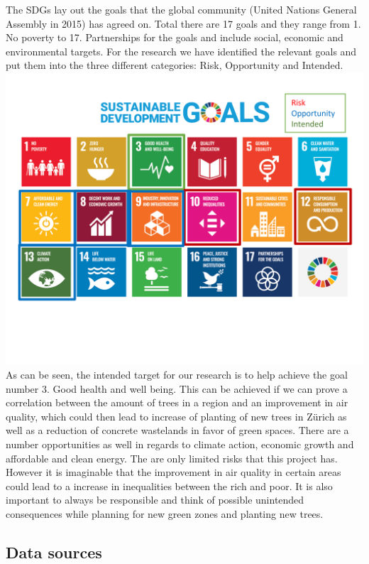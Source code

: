 \documentclass[
]{article}
\begin{document}
The SDGs lay out the goals that the global community (United Nations
General Assembly in 2015) has agreed on. Total there are 17 goals and
they range from 1. No poverty to 17. Partnerships for the goals and
include social, economic and environmental targets. For the research we
have identified the relevant goals and put them into the three different
categories: Risk, Opportunity and Intended.
\includegraphics{../images/sdg.png} As can be seen, the intended target
for our research is to help achieve the goal number 3. Good health and
well being. This can be achieved if we can prove a correlation between
the amount of trees in a region and an improvement in air quality, which
could then lead to increase of planting of new trees in Zürich as well
as a reduction of concrete wastelands in favor of green spaces. There
are a number opportunities as well in regards to climate action,
economic growth and affordable and clean energy. The are only limited
risks that this project has. However it is imaginable that the
improvement in air quality in certain areas could lead to a increase in
inequalities between the rich and poor. It is also important to always
be responsible and think of possible unintended consequences while
planning for new green zones and planting new trees.

\hypertarget{data-sources}{%
\subsection{Data sources}\label{data-sources}}
\end{document}
